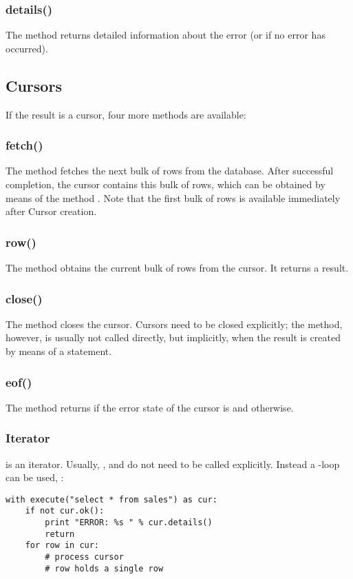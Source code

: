 \subsubsection{details()}
The method returns
detailed information about the error
(or  if no error has occurred).

\subsection{Cursors}
If the result is a cursor,
four more methods are available:

\subsubsection{fetch()}
The method fetches the next bulk
of rows from the database.
After successful completion,
the cursor contains this bulk
of rows, which can be obtained by means of
the method .
Note that the first bulk of rows
is available immediately after
Cursor creation.

\subsubsection{row()}
The method obtains the current
bulk of rows from the cursor.
It returns a  result.

\subsubsection{close()}
The method closes the cursor.
Cursors need to be closed
explicitly; the method, however,
is usually not called directly,
but implicitly, when the result
is created by means of a  statement.

\subsubsection{eof()}
The method returns 
if the error state of the cursor
is  and 
otherwise.

\subsubsection{Iterator}
 is an iterator.
Usually, , 
and  do not need to be called
explicitly.
Instead a -loop  can be used, \eg:

\begin{python}
\begin{lstlisting}
with execute("select * from sales") as cur:
    if not cur.ok():
        print "ERROR: %s " % cur.details()
        return
    for row in cur:
        # process cursor
        # row holds a single row
\end{lstlisting}
\end{python}

